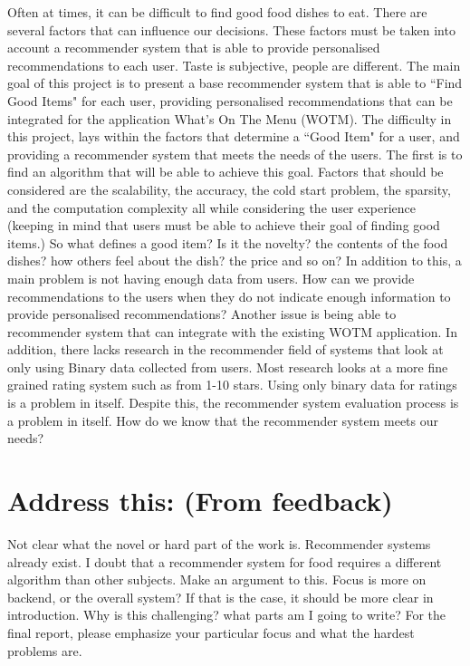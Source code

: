 Often at times, it can be difficult to find good food dishes to eat. There are several factors that can influence our decisions. These factors must be taken into account a recommender system that is able to provide personalised recommendations to each user. Taste is subjective, people are different. The main goal of this project is to present a base recommender system that is able to ``Find Good Items" for each user, providing personalised recommendations that can be integrated for the application What's On The Menu (WOTM). The difficulty in this project, lays within the factors that determine a ``Good Item" for a user, and providing a recommender system that meets the needs of the users. The first is to find an algorithm that will be able to achieve this goal. Factors that should be considered are the scalability, the accuracy, the cold start problem, the sparsity, and the computation complexity all while considering the user experience (keeping in mind that users must be able to achieve their goal of finding good items.) So what defines a good item? Is it the novelty? the contents of the food dishes? how others feel about the dish? the price and so on? In addition to this, a main problem is not having enough data from users. How can we provide recommendations to the users when they do not indicate enough information to provide personalised recommendations? Another issue is being able to recommender system that can integrate with the existing WOTM application. In addition, there lacks research in the recommender field of systems that look at only using Binary data collected from users. Most research looks at a more fine grained rating system such as from 1-10 stars. Using only binary data for ratings is a problem in itself. Despite this, the recommender system evaluation process is a problem in itself. How do we know that the recommender system meets our needs?
 
\section{Address this: (From feedback)}
Not clear what the novel or hard part of the work is. Recommender systems already exist. I doubt that a recommender system for food requires a different algorithm than other subjects. Make an argument to this.
Focus is more on backend, or the overall system? If that is the case, it should be more clear in introduction. Why is this challenging? 
what parts am I going to write?
For the final report, please emphasize your particular focus and what the hardest problems are. 

